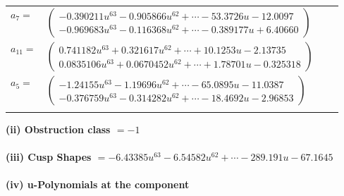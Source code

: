 \documentclass[1p]{elsarticle_modified}
\theoremstyle{definition}
\begin{document}
\begin{tabular}{m{7pt} m{180pt} m{7pt} m{180pt} }
\flushright $a_{7}=$&$\begin{pmatrix}-0.390211 u^{63}-0.905866 u^{62}+\cdots-53.3726 u-12.0097\\-0.969683 u^{63}-0.116368 u^{62}+\cdots-0.389177 u+6.40660\end{pmatrix}$ \\
\flushright $a_{11}=$&$\begin{pmatrix}0.741182 u^{63}+0.321617 u^{62}+\cdots+10.1253 u-2.13735\\0.0835106 u^{63}+0.0670452 u^{62}+\cdots+1.78701 u-0.325318\end{pmatrix}$ \\
\flushright $a_{5}=$&$\begin{pmatrix}-1.24155 u^{63}-1.19696 u^{62}+\cdots-65.0895 u-11.0387\\-0.376759 u^{63}-0.314282 u^{62}+\cdots-18.4692 u-2.96853\end{pmatrix}$\\&\end{tabular}
\flushleft \textbf{(ii) Obstruction class $= -1$}\\~\\
\flushleft \textbf{(iii) Cusp Shapes $= -6.43385 u^{63}-6.54582 u^{62}+\cdots-289.191 u-67.1645$}\\~\\
\newpage\renewcommand{\arraystretch}{1}
\flushleft \textbf{(iv) u-Polynomials at the component}\newline \\
\end{document}
